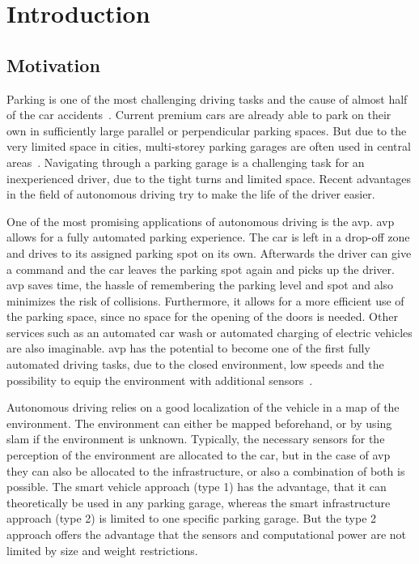 \chapter{Introduction}
\label{ch:Introduction}

\section{Motivation}
Parking is one of the most challenging driving tasks and the cause of almost half of the car accidents~\cite{accident2015}.
Current premium cars are already able to park on their own in sufficiently large parallel or perpendicular parking spaces.
But due to the very limited space in cities, multi-storey parking garages are often used in central areas~\cite{Khalid2021}.
Navigating through a parking garage is a challenging task for an inexperienced driver, due to the tight turns and limited space.
Recent advantages in the field of autonomous driving try to make the life of the driver easier.

One of the most promising applications of autonomous driving is the \gls{avp}.
\gls{avp} allows for a fully automated parking experience.
The car is left in a drop-off zone and drives to its assigned parking spot on its own.
Afterwards the driver can give a command and the car leaves the parking spot again and picks up the driver.
\gls{avp} saves time, the hassle of remembering the parking level and spot and also minimizes the risk of collisions.
Furthermore, it allows for a more efficient use of the parking space, since no space for the opening of the doors is needed.
Other services such as an automated car wash or automated charging of electric vehicles are also imaginable.
\gls{avp} has the potential to become one of the first fully automated driving tasks, due to the closed environment, low speeds and the possibility to equip the environment with additional sensors~\cite{Banzhaf2017}.

Autonomous driving relies on a good localization of the vehicle in a map of the environment.
The environment can either be mapped beforehand, or by using \gls{slam} if the environment is unknown.
Typically, the necessary sensors for the perception of the environment are allocated to the car, but in the case of \gls{avp} they can also be allocated to the infrastructure, or also a combination of both is possible.
The smart vehicle approach (type 1) has the advantage, that it can theoretically be used in any parking garage, whereas the smart infrastructure approach (type 2) is limited to one specific parking garage.
But the type 2 approach offers the advantage that the sensors and computational power are not limited by size and weight restrictions.

